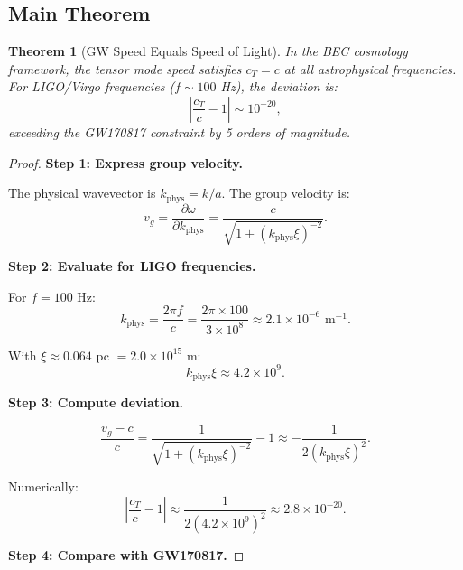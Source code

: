 \documentclass[11pt,a4paper]{article}
\newcommand{\cT}{\ensuremath{c_T}}
\newtheorem{theorem}{Theorem}[section]
\theoremstyle{definition}
\theoremstyle{remark}
\begin{document}
\subsection{Main Theorem}
\label{sec:main_theorem}

\begin{theorem}[GW Speed Equals Speed of Light]
\label{thm:cT_equals_c}
In the BEC cosmology framework, the tensor mode speed satisfies $\cT = c$ at all astrophysical frequencies. For LIGO/Virgo frequencies ($f \sim 100$ Hz), the deviation is:
\begin{equation}
\left|\frac{\cT}{c} - 1\right| \sim 10^{-20},
\end{equation}
exceeding the GW170817 constraint by 5 orders of magnitude.
\end{theorem}

\begin{proof}
\textbf{Step 1: Express group velocity.}

The physical wavevector is $k_{\mathrm{phys}} = k/a$. The group velocity is:
\begin{equation}
v_g = \frac{\partial\omega}{\partial k_{\mathrm{phys}}} = \frac{c}{\sqrt{1 + (k_{\mathrm{phys}}\xi)^{-2}}}.
\end{equation}

\textbf{Step 2: Evaluate for LIGO frequencies.}

For $f = 100$ Hz:
\begin{equation}
k_{\mathrm{phys}} = \frac{2\pi f}{c} = \frac{2\pi \times 100}{3 \times 10^8} \approx 2.1 \times 10^{-6} \text{ m}^{-1}.
\end{equation}

With $\xi \approx 0.064$ pc $= 2.0 \times 10^{15}$ m:
\begin{equation}
k_{\mathrm{phys}}\xi \approx 4.2 \times 10^{9}.
\end{equation}

\textbf{Step 3: Compute deviation.}

\begin{equation}
\frac{v_g - c}{c} = \frac{1}{\sqrt{1 + (k_{\mathrm{phys}}\xi)^{-2}}} - 1 \approx -\frac{1}{2(k_{\mathrm{phys}}\xi)^2}.
\end{equation}

Numerically:
\begin{equation}
\left|\frac{\cT}{c} - 1\right| \approx \frac{1}{2(4.2 \times 10^{9})^2} \approx 2.8 \times 10^{-20}.
\end{equation}

\textbf{Step 4: Compare with GW170817.}


\end{proof}
\end{document}
